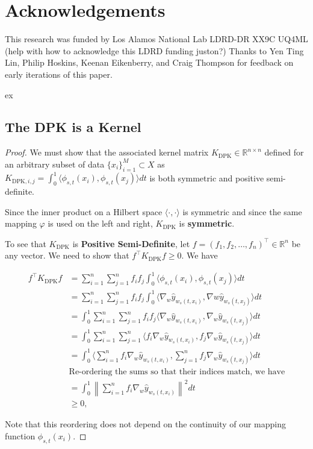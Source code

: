 \section{Acknowledgements}

This research was funded by Los Alamos National Lab LDRD-DR XX9C UQ4ML (help with how to acknowledge this LDRD funding juston?) Thanks to Yen Ting Lin, Philip Hoskins, Keenan Eikenberry, and Craig Thompson for feedback on early iterations of this paper. 



ex
\subsection{The DPK is a Kernel}

\ker*
\begin{proof}
We must show that the associated kernel matrix $K_{\text{DPK}} \in \mathbb{R}^{n\times n}$ defined for an arbitrary subset of data $\{x_i\}_{i=1}^M \subset X$ as $K_{\text{DPK},i,j} = \int_0^1\langle \phi_{s,t}(x_i), \phi_{s,t}(x_j)\rangle dt$ is both symmetric and positive semi-definite.

Since the inner product on a Hilbert space $\langle \cdot, \cdot \rangle$ is symmetric and since the same mapping $\varphi$ is used on the left and right, $K_{\text{DPK}}$ is \textbf{symmetric}. 

To see that $K_{\text{DPK}}$ is \textbf{Positive Semi-Definite}, let $f = (f_1, f_2, \dots, f_n)^\top \in \mathbb{R}^n$ be any vector. We need to show that $f^\top K_{\text{DPK}} f \geq 0$. We have

\begin{align}
f^\top K_{\text{DPK}} f &= \sum_{i=1}^n \sum_{j=1}^n f_i f_j \int_0^1 \langle \phi_{s,t}(x_i), \phi_{s,t}(x_j)\rangle dt \\
&= \sum_{i=1}^n \sum_{j=1}^n f_i f_j \int_0^1 \langle \nabla_{w}\hat{y}_{w_s(t,x_i)}, \nabla{w}\hat{y}_{w_s(t,x_j)}\rangle dt \\
&= \int_0^1 \sum_{i=1}^n \sum_{j=1}^n f_i f_j \langle \nabla_{w}\hat{y}_{w_s(t,x_i)}, \nabla_{w}\hat{y}_{w_s(t,x_j)}\rangle dt \\
&= \int_0^1 \sum_{i=1}^n \sum_{j=1}^n  \langle f_i \nabla_{w}\hat{y}_{w_s(t,x_i)}, f_j \nabla_{w}\hat{y}_{w_s(t,x_j)}\rangle dt \\
&= \int_0^1    \langle \sum_{i=1}^n f_i \nabla_{w}\hat{y}_{w_s(t,x_i)}, \sum_{j=1}^n f_j \nabla_{w}\hat{y}_{w_s(t,x_j)}\rangle dt \\
& \text{Re-ordering the sums so that their indices match, we have}\\
&= \int_0^1 \left\lVert \sum_{i=1}^n f_i \nabla_{w}\hat{y}_{w_s(t,x_i)}\right\rVert^2 dt \\
&\geq 0,
\end{align}

Note that this reordering does not depend on the continuity of our mapping function $\phi_{s,t}(x_i)$.

\end{proof}

